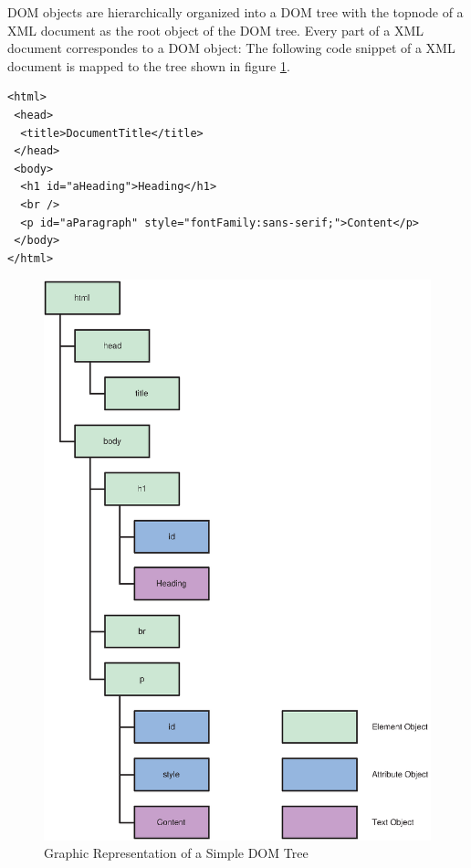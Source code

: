 
DOM objects are hierarchically organized into a DOM tree with the topnode of a XML document as the root object of the DOM tree. Every part of a XML document correspondes to a DOM object: The following code snippet of a XML document is mapped to the tree shown in figure \ref{fig:simpleDomTree}.

\begin{verbatim}
<html>
 <head>
  <title>DocumentTitle</title>
 </head>
 <body>
  <h1 id="aHeading">Heading</h1>
  <br />
  <p id="aParagraph" style="fontFamily:sans-serif;">Content</p>
 </body>
</html>
\end{verbatim}

\begin{figure}[htbp]
	\centering
		\includegraphics[scale=0.5]{simpleDomTree}
	\caption{Graphic Representation of a Simple DOM Tree}
	\label{fig:simpleDomTree}
\end{figure}

